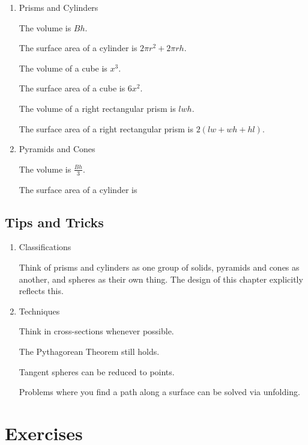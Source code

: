 \begin{enumerate}
\item Prisms and Cylinders

\begin{itemize}
\Item The volume is $Bh.$

\Item The surface area of a cylinder is $2\pi r^2+2\pi rh.$

\Item The volume of a cube is $x^3.$

\Item The surface area of a cube is $6x^2.$

\Item The volume of a right rectangular prism is $lwh.$

\Item The surface area of a right rectangular prism is $2(lw+wh+hl).$
\end{itemize}
\item Pyramids and Cones
\begin{itemize}
\Item The volume is $\frac{Bh}{3}.$

\Item The surface area of a cylinder is 
\end{itemize}
\end{enumerate}

\subsection{Tips and Tricks}
\begin{enumerate}
\item Classifications
\begin{itemize}
\Item Think of prisms and cylinders as one group of solids, pyramids and cones as another, and spheres as their own thing.
\Item The design of this chapter explicitly reflects this.
\end{itemize}
\item Techniques
\begin{itemize}
\Item Think in cross-sections whenever possible.

\Item The Pythagorean Theorem still holds.

\Item Tangent spheres can be reduced to points.

\Item Problems where you find a path along a surface can be solved via unfolding.
\end{itemize}
\end{enumerate}

\pagebreak

\section{Exercises}

